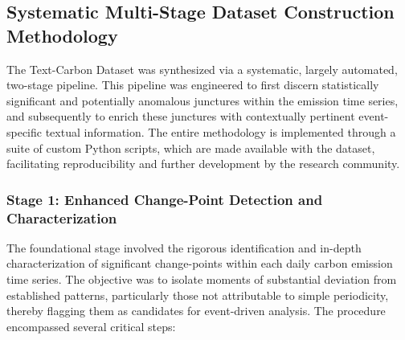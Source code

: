 \subsection{Systematic Multi-Stage Dataset Construction Methodology}
\label{subsec:DatasetMethodology}
The Text-Carbon Dataset was synthesized via a systematic, largely automated, two-stage pipeline. This pipeline was engineered to first discern statistically significant and potentially anomalous junctures within the emission time series, and subsequently to enrich these junctures with contextually pertinent event-specific textual information. The entire methodology is implemented through a suite of custom Python scripts, which are made available with the dataset, facilitating reproducibility and further development by the research community.


\subsubsection{Stage 1: Enhanced Change-Point Detection and Characterization}
\label{subsubsec:ChangePointEnhancement}
The foundational stage involved the rigorous identification and in-depth characterization of significant change-points within each daily carbon emission time series. The objective was to isolate moments of substantial deviation from established patterns, particularly those not attributable to simple periodicity, thereby flagging them as candidates for event-driven analysis. The procedure encompassed several critical steps:

